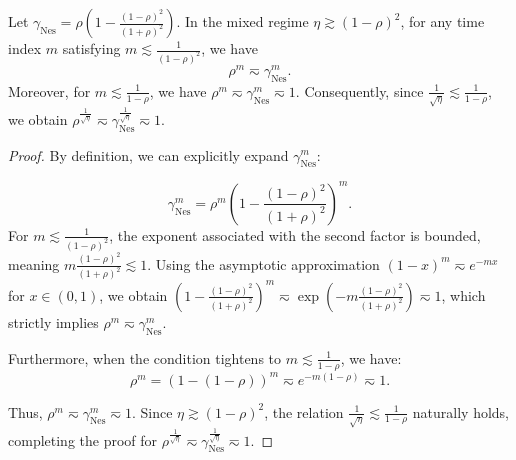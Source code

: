 \begin{lemma}
\label{lem:nes_rho_gamma}
Let $\gamma_{\mathrm{Nes}} = \rho\left(1-\frac{(1-\rho)^2}{(1+\rho)^2}\right)$. In the mixed regime $\eta \gtrsim (1-\rho)^2$, for any time index $m$ satisfying $m \lesssim \frac{1}{(1-\rho)^2}$, we have 
\[
\rho^m \eqsim \gamma_{\mathrm{Nes}}^m.
\]
Moreover, for $m \lesssim \frac{1}{1-\rho}$, we have $\rho^m \eqsim \gamma_{\mathrm{Nes}}^m \eqsim 1$. Consequently, since $\frac{1}{\sqrt{\eta}} \lesssim \frac{1}{1-\rho}$, we obtain $\rho^{\frac{1}{\sqrt{\eta}}} \eqsim \gamma_{\mathrm{Nes}}^{\frac{1}{\sqrt{\eta}}} \eqsim 1$.
\end{lemma}
\begin{proof}
By definition, we can explicitly expand $\gamma_{\mathrm{Nes}}^m$:


\begin{equation*}
    \gamma_{\mathrm{Nes}}^m = \rho^m \left(1-\frac{(1-\rho)^2}{(1+\rho)^2}\right)^m.
\end{equation*}
For $m \lesssim \frac{1}{(1-\rho)^2}$, the exponent associated with the second factor is bounded, meaning $m \frac{(1-\rho)^2}{(1+\rho)^2} \lesssim 1$. Using the asymptotic approximation $(1-x)^m \eqsim e^{-mx}$ for $x \in (0,1)$, we obtain $\left(1-\frac{(1-\rho)^2}{(1+\rho)^2}\right)^m \eqsim \exp\left(-m \frac{(1-\rho)^2}{(1+\rho)^2}\right) \eqsim 1$, which strictly implies $\rho^m \eqsim \gamma_{\mathrm{Nes}}^m$.

Furthermore, when the condition tightens to $m \lesssim \frac{1}{1-\rho}$, we have:
\begin{equation*}
    \rho^m = (1-(1-\rho))^m \eqsim e^{-m(1-\rho)} \eqsim 1.
\end{equation*}

Thus, $\rho^m \eqsim \gamma_{\mathrm{Nes}}^m \eqsim 1$. Since $\eta \gtrsim (1-\rho)^2$, the relation $\frac{1}{\sqrt{\eta}} \lesssim \frac{1}{1-\rho}$ naturally holds, completing the proof for $\rho^{\frac{1}{\sqrt{\eta}}} \eqsim \gamma_{\mathrm{Nes}}^{\frac{1}{\sqrt{\eta}}} \eqsim 1$.

\end{proof}


